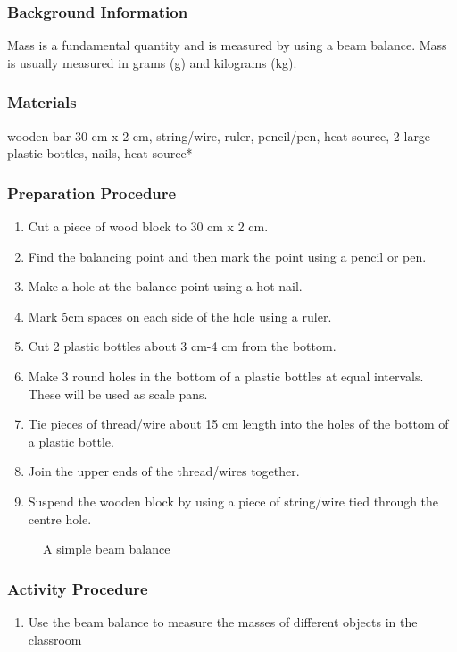 \subsubsection*{Background Information}
Mass is a fundamental quantity and is measured by using a beam balance. Mass is usually measured in grams (g) and kilograms (kg).

\subsubsection*{Materials}
wooden bar 30 cm x 2 cm, string/wire, ruler, pencil/pen, heat source, 2 large plastic bottles, nails, heat source*

\subsubsection*{Preparation Procedure}
\begin{enumerate}
\item{Cut a piece of wood block to 30 cm x 2 cm.} 
\item{Find the balancing point and then mark the point using a pencil or pen.} 
\item{Make a hole at the balance point using a hot nail.} 
\item{Mark 5cm spaces on each side of the hole using a ruler.} 
\item{Cut 2 plastic bottles about 3 cm-4 cm from the bottom.} 
\item{Make 3 round holes in the bottom of a plastic bottles at equal intervals. These will be used as scale pans.} 
\item{Tie pieces of thread/wire about 15 cm length into the holes of the bottom of a plastic bottle.} 
\item{Join the upper ends of the thread/wires together.} 
\item{Suspend the wooden block by using a piece of string/wire tied through the centre hole.} 
\end{enumerate}

\begin{figure}
\begin{center}
\def\svgwidth{2cm}

\caption{A simple beam balance}
\label{fig:beam-balance}
\end{center}
\end{figure}

\subsubsection*{Activity Procedure}
\begin{enumerate}
\item{Use the beam balance to measure the masses of different objects in the classroom}
\end{enumerate}

